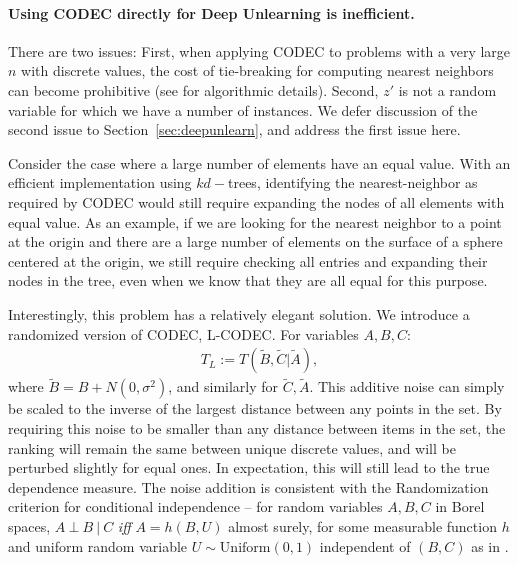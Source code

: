 

\paragraph{Using CODEC directly for Deep Unlearning is inefficient.} There are two issues: First, when applying CODEC to problems with a very large $n$ with discrete values, the cost of tie-breaking for computing nearest neighbors can become prohibitive (see  for algorithmic details). Second, $z'$ is not a random variable for which we have a number of instances. We defer discussion of the second issue  to Section~\ref{sec:deepunlearn}, and address the first issue here.

Consider the case where a large number of elements have an equal value. With an efficient implementation using $kd-$trees, identifying the nearest-neighbor as required by CODEC would still require expanding the nodes of all elements with equal value. As an example, if we are looking for the nearest neighbor to a point at the origin and there are a large number of elements on the surface of a sphere centered at the origin, we still require checking all entries and expanding their nodes in the tree, even when we know that they are all equal for this purpose.

Interestingly, this problem has a relatively elegant solution.
We introduce a randomized version of CODEC, L-CODEC. For variables $A,B,C$:
\begin{align}\label{eq:lcodec}
T_L := T\left(\tilde{B}, \tilde{C} | \tilde{A} \right),
\end{align}
where $\tilde{B} = B + N(0,\sigma^2)$, and similarly for $\tilde{C}, \tilde{A}$.
This additive noise can simply be scaled to the inverse of the largest distance between any points in the set.
By requiring this noise to be smaller than any distance between items in the set, the ranking will remain the same between unique discrete values, and will be perturbed slightly for equal ones.
In expectation, this will still lead to the true dependence measure. The noise addition is consistent with the Randomization criterion for conditional independence -- for random variables $A, B, C$ in Borel spaces, $A\ \bot\ B\ |\ C$ \textit{iff} $A = h(B, U)$ almost surely, for some measurable function $h$ and uniform random variable $U \sim \text{Uniform}(0,1)$ independent of $(B,C)$ as in \cite{ptheory}. 

